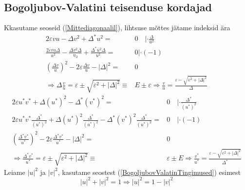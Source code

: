 \documentclass[class=article, crop=false]{standalone}
\begin{document}
\subsection{Bogoljubov-Valatini teisenduse kordajad}
Kkasutame seoseid (\ref{Mittediagonaalil}), lihtsuse mõttes jätame indeksid ära
\begin{equation}\label{VJagatudU}
	\begin{split}
		2 \varepsilon v u - \Delta v^{2} + \Delta^{ \ast} u^{2} = & 0 \quad | \cdot \frac{ \Delta}{u^{2}} \\
		\frac{2 \varepsilon v u \Delta}{u^{2}}  - \frac{ \Delta v^{2} \Delta}{u_{2}} + \frac{ \Delta^{ \ast} u^{2} \Delta}{ u^{2}} = & 0 | \cdot (-1) \\
		\left( \frac{ \Delta v}{u} \right)^{2} - 2 \varepsilon \frac{ \Delta v}{u} - | \Delta|^{2} = & 0 \\
		\Rightarrow \Delta \frac{v}{u} = \varepsilon \pm \sqrt{ \varepsilon^{2} + |\Delta|^{2} } \equiv & E \pm \varepsilon \Rightarrow \frac{v}{u} = \frac{ \varepsilon - \sqrt{ \varepsilon^{2} + | \Delta|^{2}}}{ \Delta}
	\end{split}
\end{equation}
\begin{equation}\label{VJahatudUKaaskompleks}
	\begin{split}
		2 \varepsilon u^{ \ast} v^{ \ast} + \Delta (u^{ \ast})^{2} - \Delta^{ \ast} (v^{ \ast})^{2} = & 0 \quad | \cdot \frac{ \Delta^{ \ast}}{(u^{ \ast})^{2}} \\
		2 \varepsilon u^{ \ast} v^{ \ast} \frac{ \Delta^{ \ast}}{(u^{ \ast})^{2}} + \Delta (u^{ \ast})^{2} \frac{ \Delta^{ \ast}}{(u^{ \ast})^{2}} - \Delta^{ \ast} (v^{ \ast})^{2} \frac{ \Delta^{ \ast}}{(u^{ \ast})^{2}} = & 0 \quad | \cdot (-1) \\
		\left( \frac{ \Delta^{ \ast} v^{ \ast}}{u^{ \ast}} \right)^{2} - 2 \varepsilon \frac{ \Delta^{ \ast} v^{ \ast}}{u^{ \ast}} - | \Delta|^{2} = & 0 \\
		\Rightarrow \frac{ \Delta^{ \ast} v^{ \ast}}{u^{ \ast}} = \varepsilon \pm \sqrt{ \varepsilon^{2} + | \Delta|^{2}} \equiv & \varepsilon \pm E \Rightarrow \frac{v^{ \ast}}{u^{ \ast}} = \frac{ \varepsilon - \sqrt{ \varepsilon^{2} + | \Delta|^{2}}}{ \Delta^{ \ast}}
	\end{split}
\end{equation}
Leiame $ |u|^{2} $ ja $ |v|^{2} $, kasutame seostest (\ref{BogoljubovValatinTingimused}) esimest
\begin{equation}\label{key}
	|u|^{2} + |v|^{2} = 1 \Rightarrow |u|^{2} = 1 - |v|^{2}
\end{equation}
\end{document}
